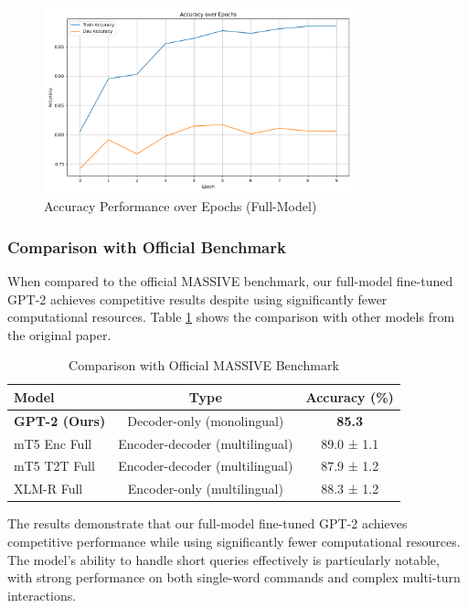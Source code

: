 \documentclass{article}
\begin{document}
\begin{figure}[h]
\centering
\includegraphics[width=0.8\textwidth]{full-model/accuracy_metrics.png}
\caption{Accuracy Performance over Epochs (Full-Model)}
\label{fig:accuracy_comparison}
\end{figure}

\subsubsection{Comparison with Official Benchmark}
When compared to the official MASSIVE benchmark, our full-model fine-tuned GPT-2 achieves competitive results despite using significantly fewer computational resources. Table \ref{tab:benchmark_comparison} shows the comparison with other models from the original paper.

\begin{table}[h]
\centering
\begin{tabular}{lcc}
\toprule
\textbf{Model} & \textbf{Type} & \textbf{Accuracy (\%)} \\
\midrule
\textbf{GPT-2 (Ours)} & Decoder-only (monolingual) & \textbf{85.3} \\
mT5 Enc Full & Encoder-decoder (multilingual) & 89.0 ± 1.1 \\
mT5 T2T Full & Encoder-decoder (multilingual) & 87.9 ± 1.2 \\
XLM-R Full & Encoder-only (multilingual) & 88.3 ± 1.2 \\
\bottomrule
\end{tabular}
\caption{Comparison with Official MASSIVE Benchmark}
\label{tab:benchmark_comparison}
\end{table}

The results demonstrate that our full-model fine-tuned GPT-2 achieves competitive performance while using significantly fewer computational resources. The model's ability to handle short queries effectively is particularly notable, with strong performance on both single-word commands and complex multi-turn interactions.
\end{document}
